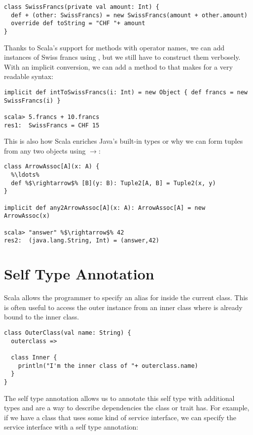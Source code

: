 \begin{lstlisting}
class SwissFrancs(private val amount: Int) {
  def + (other: SwissFrancs) = new SwissFrancs(amount + other.amount)
  override def toString = "CHF "+ amount
}
\end{lstlisting}

Thanks to Scala's support for methods with operator names, we can add instances of Swiss francs using \src{+}, but we still have to construct them verbosely. With an implicit conversion, we can add a  method to  that makes for a very readable syntax:

\begin{lstlisting}
implicit def intToSwissFrancs(i: Int) = new Object { def francs = new SwissFrancs(i) }

scala> 5.francs + 10.francs
res1:  SwissFrancs = CHF 15
\end{lstlisting}

This is also how Scala enriches Java's built-in types or why we can form tuples from any two objects using $\rightarrow$:

\begin{lstlisting}
class ArrowAssoc[A](x: A) {
  %\ldots%
  def %$\rightarrow$% [B](y: B): Tuple2[A, B] = Tuple2(x, y)
}

implicit def any2ArrowAssoc[A](x: A): ArrowAssoc[A] = new ArrowAssoc(x)

scala> "answer" %$\rightarrow$% 42
res2:  (java.lang.String, Int) = (answer,42)
\end{lstlisting}

\section{Self Type Annotation} \label{section:self-type-annotation}

Scala allows the programmer to specify an alias for  inside the current class. This is often useful to access the outer instance from an inner class where  is already bound to the inner class. 

\begin{lstlisting}
class OuterClass(val name: String) {
  outerclass =>

  class Inner {
    println("I'm the inner class of "+ outerclass.name)
  }
}
\end{lstlisting}

The self type annotation allows us to annotate this self type with additional types and are a way to describe dependencies the class or trait has. For example, if we have a class that uses some kind of service interface, we can specify the service interface with a self type annotation:

